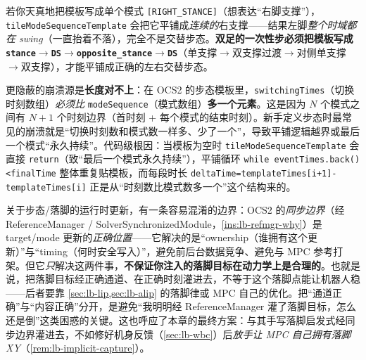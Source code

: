 \begin{pitfall}\label{pit:lb-tile}
若你天真地把模板写成单个模式 \texttt{[RIGHT\_STANCE]}（想表达“右脚支撑”），\texttt{tileModeSequenceTemplate} 会把它平铺成\emph{连续的}右支撑——结果左脚\emph{整个时域都在 swing}（一直抬着不落），完全不是交替步态。\textbf{双足的一次性步必须把模板写成 \texttt{stance$\to$DS$\to$opposite\_stance$\to$DS}}（单支撑$\to$双支撑过渡$\to$对侧单支撑$\to$双支撑），才能平铺成正确的左右交替步态。

更隐蔽的崩溃源是\textbf{长度对不上}：在 OCS2 的步态模板里，\texttt{switchingTimes}（切换时刻数组）\emph{必须比} \texttt{modeSequence}（模式数组）\textbf{多一个元素}。这是因为 $N$ 个模式之间有 $N+1$ 个时刻边界（首时刻 + 每个模式的结束时刻）。新手定义步态时最常见的崩溃就是“切换时刻数和模式数一样多、少了一个”，导致平铺逻辑越界或最后一个模式“永久持续”。代码级根因：当模板为空时 \texttt{tileModeSequenceTemplate} 会直接 \texttt{return}（致“最后一个模式永久持续”），平铺循环 \texttt{while eventTimes.\allowbreak back()<finalTime} 整体重复贴模板，而每段时长 \texttt{deltaTime=templateTimes[i+1]-templateTimes[i]} 正是从“时刻数比模式数多一个”这个结构来的。
\end{pitfall}

\begin{insight}\label{ins:lb-sync-boundary}
关于步态/落脚的运行时更新，有一条容易混淆的边界：OCS2 的\emph{同步边界}（经 ReferenceManager / SolverSynchronizedModule，\cref{ins:lb-refmgr-why}）是 target/mode 更新的\emph{正确位置}——它解决的是“ownership（谁拥有这个更新）”与“timing（何时安全写入）”，避免前后台数据竞争、避免与 MPC 参考打架。但它\emph{只}解决这两件事，\textbf{不保证你注入的落脚目标在动力学上是合理的}。也就是说，把落脚目标经正确通道、在正确时刻灌进去，不等于这个落脚点能让机器人稳——后者要靠 \cref{sec:lb-lip,sec:lb-alip} 的落脚律或 MPC 自己的优化。把“通道正确”与“内容正确”分开，是避免“我明明经 ReferenceManager 灌了落脚目标，怎么还是倒”这类困惑的关键。这也呼应了本章的最终方案：与其手写落脚启发式经同步边界灌进去，不如修好机身反馈（\cref{sec:lb-wbc}）后\emph{放手让 MPC 自己拥有落脚 XY}（\cref{rem:lb-implicit-capture}）。
\end{insight}

